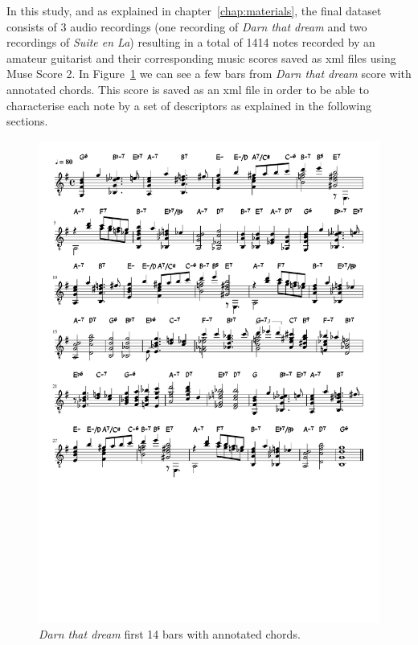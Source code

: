 In this study, and as explained in chapter~\ref{chap:materials}, the final dataset consists of 3 audio recordings (one recording of \textit{Darn that dream} and two recordings of \textit{Suite en La}) resulting in a total of 1414 notes recorded by an amateur guitarist and their corresponding music scores saved as xml files using Muse Score 2. In Figure~\ref{fig:darn_score} we can see a few bars from \textit{Darn that dream} score with annotated chords. This score is saved as an xml file in order to be able to characterise each note by a set of descriptors as explained in the following sections.  

\begin{figure}[ht!]
    \centering
    \includegraphics[clip, trim=0cm 19cm 0cm 0cm, width=\textwidth]{Figures/Darn_that_dream.pdf}
    \caption{\textit{Darn that dream} first 14 bars with annotated chords.}
    \label{fig:darn_score}    
\end{figure}

